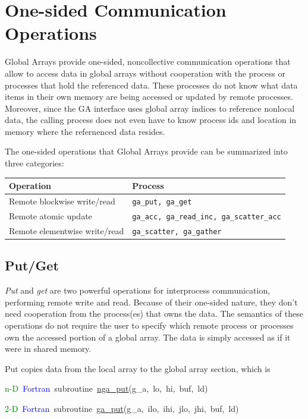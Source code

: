 \chapter{One-sided Communication Operations}

Global Arrays provide one-sided, noncollective communication operations
that allow to access data in global arrays without cooperation with
the process or processes that hold the referenced data. These processes
do not know what data items in their own memory are being accessed
or updated by remote processes. Moreover, since the GA interface uses
global array indices to reference nonlocal data, the calling process
does not even have to know process ids and location in memory where
the refernenced data resides.

The one-sided operations that Global Arrays provide can be summarized
into three categories: 

\begin{tabular}{|>{\centering}p{4cm}|>{\centering}p{4cm}|}
\hline 
Operation & Process\tabularnewline
\hline
\hline 
Remote blockwise write/read & \texttt{ga\_put, ga\_get}\tabularnewline
\hline 
Remote atomic update & \texttt{ga\_acc, ga\_read\_inc, ga\_scatter\_acc}\tabularnewline
\hline 
Remote elementwise write/read & \texttt{ga\_scatter, ga\_gather}\tabularnewline
\hline
\end{tabular}


\section{Put/Get }

\emph{Put} and \emph{get} are two powerful operations for interprocess
communication, performing remote write and read. Because of their
one-sided nature, they don't need cooperation from the process(es)
that owns the data. The semantics of these operations do not require
the user to specify which remote process or processes own the accessed
portion of a global array. The data is simply accessed as if it were
in shared memory.

Put copies data from the local array to the global array section,
which is

\textcolor{green}{n-D}~\textcolor{blue}{Fortran}~subroutine~\href{https://hpc.pnl.gov/globalarrays/api/f_op_api.html\#PUT}{nga\_{}put}(g\_a,~lo,~hi,~buf,~ld)~

\textcolor{green}{2-D}~\textcolor{blue}{Fortran}~subroutine~\href{https://hpc.pnl.gov/globalarrays/api/f_op_api.html\#PUT}{ga\_{}put}(g\_a,~ilo,~ihi,~jlo,~jhi,~buf,~ld)~

